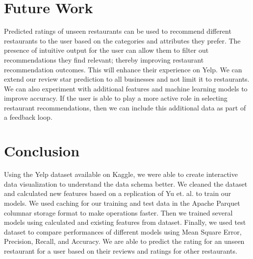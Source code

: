 \documentclass[12pt]{article}
\begin{document}
\section{Future Work}

Predicted ratings of unseen restaurants can be used to recommend different restaurants to the
user based on the categories and attributes they prefer. The presence of intuitive output for
the user can allow them to filter out recommendations they find relevant; thereby improving
restaurant recommendation outcomes. This will enhance their experience on Yelp. We can extend
our review star prediction to all businesses and not limit it to restaurants. We can also
experiment with additional features and machine learning models to improve accuracy. If the
user is able to play a more active role in selecting restaurant recommendations, then we can
include this additional data as part of a feedback loop.

\section{Conclusion}

Using the Yelp dataset available on Kaggle, we were able to create interactive data
visualization to understand the data schema better. We cleaned the dataset and calculated
new features based on a replication of Yu et. al. \cite{yu2015restaurants} to train our
models. We used caching for our training and test data in the Apache Parquet columnar storage
format to make operations faster. Then we trained several models using calculated and existing
features from dataset. Finally, we used test dataset to compare performances of different
models using Mean Square Error, Precision, Recall, and Accuracy. We are able to predict the
rating for an unseen restaurant for a user based on their reviews and ratings for other
restaurants.


 

\end{document}

